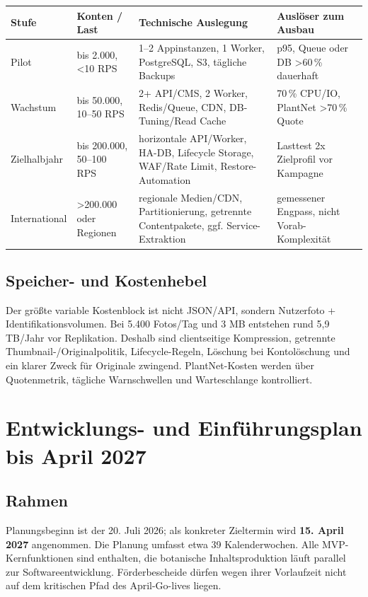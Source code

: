 \documentclass[10pt,a4paper,oneside]{article}
\begin{document}
\begin{tabularx}{\textwidth}{@{}p{25mm}p{33mm}X X@{}}
\toprule
\textbf{Stufe} & \textbf{Konten / Last} & \textbf{Technische Auslegung} & \textbf{Auslöser zum Ausbau} \\
\midrule
Pilot & bis 2.000, <10 RPS & 1--2 Appinstanzen, 1 Worker, PostgreSQL, S3, tägliche Backups & p95, Queue oder DB >60\,\% dauerhaft \\
Wachstum & bis 50.000, 10--50 RPS & 2+ API/CMS, 2 Worker, Redis/Queue, CDN, DB-Tuning/Read Cache & 70\,\% CPU/IO, PlantNet >70\,\% Quote \\
Zielhalbjahr & bis 200.000, 50--100 RPS & horizontale API/Worker, HA-DB, Lifecycle Storage, WAF/Rate Limit, Restore-Automation & Lasttest 2x Zielprofil vor Kampagne \\
International & >200.000 oder Regionen & regionale Medien/CDN, Partitionierung, getrennte Contentpakete, ggf. Service-Extraktion & gemessener Engpass, nicht Vorab-Komplexität \\
\bottomrule
\end{tabularx}

\subsection{Speicher- und Kostenhebel}

Der größte variable Kostenblock ist nicht JSON/API, sondern Nutzerfoto + Identifikationsvolumen. Bei 5.400 Fotos/Tag und 3 MB entstehen rund 5,9 TB/Jahr vor Replikation. Deshalb sind clientseitige Kompression, getrennte Thumbnail-/Originalpolitik, Lifecycle-Regeln, Löschung bei Kontolöschung und ein klarer Zweck für Originale zwingend. PlantNet-Kosten werden über Quotenmetrik, tägliche Warnschwellen und Warteschlange kontrolliert.

\section{Entwicklungs- und Einführungsplan bis April 2027}

\subsection{Rahmen}

Planungsbeginn ist der 20. Juli 2026; als konkreter Zieltermin wird \textbf{15. April 2027} angenommen. Die Planung umfasst etwa 39 Kalenderwochen. Alle MVP-Kernfunktionen sind enthalten, die botanische Inhaltsproduktion läuft parallel zur Softwareentwicklung. Förderbescheide dürfen wegen ihrer Vorlaufzeit nicht auf dem kritischen Pfad des April-Go-lives liegen.
\end{document}
